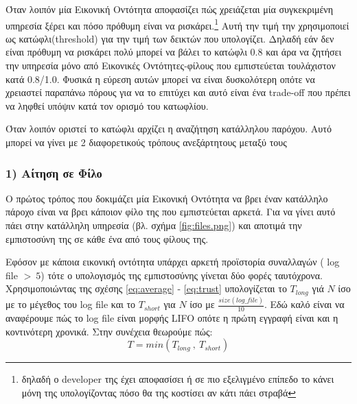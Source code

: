 Όταν λοιπόν μία Εικονική Οντότητα αποφασίζει πώς χρειάζεται μία συγκεκριμένη υπηρεσία ξέρει και πόσο πρόθυμη είναι να ρισκάρει.\footnote{δηλαδή ο developer της έχει αποφασίσει ή σε πιο εξελιγμένο επίπεδο το κάνει μόνη της υπολογίζοντας πόσο θα της κοστίσει αν κάτι πάει στραβά} Αυτή την τιμή την χρησιμοποιεί ως κατώφλι(threshold) για την τιμή των δεικτών που υπολογίζει. Δηλαδή εάν δεν είναι πρόθυμη να ρισκάρει πολύ μπορεί να βάλει το κατώφλι 0.8 και άρα να ζητήσει την υπηρεσία μόνο από Εικονικές Οντότητες-φίλους που εμπιστεύεται τουλάχιστον κατά 0.8/1.0. Φυσικά η εύρεση αυτών μπορεί να είναι δυσκολότερη οπότε να χρειαστεί παραπάνω πόρους για να το επιτύχει και αυτό είναι ένα trade-off που πρέπει να ληφθεί υπόψιν κατά τον ορισμό του κατωφλίου.

Όταν λοιπόν οριστεί το κατώφλι αρχίζει η αναζήτηση κατάλληλου παρόχου. Αυτό μπορεί να γίνει με 2 διαφορετικούς τρόπους ανεξάρτητους μεταξύ τους
\subsubsection{1) Αίτηση σε Φίλο}

Ο πρώτος τρόπος που δοκιμάζει μία Εικονική Οντότητα να βρει έναν κατάλληλο πάροχο είναι να βρει κάποιον φίλο της που εμπιστεύεται αρκετά. Για να γίνει αυτό πάει στην κατάλληλη υπηρεσία (βλ. σχήμα \ref{fig:files.png}) και αποτιμά την εμπιστοσύνη της σε κάθε ένα από τους φίλους της. 

Εφόσον με κάποια εικονική οντότητα υπάρχει αρκετή προϊστορία συναλλαγών ( log file $> \  5$) τότε ο υπολογισμός της εμπιστοσύνης γίνεται δύο φορές ταυτόχρονα. Χρησιμοποιώντας της σχέσης \ref{eq:average} - \ref{eq:trust} υπολογίζεται το $T_{long}$ γιά $ N $ ίσο με το μέγεθος του log file και το $T_{short}$ για $N$ ίσο με $\frac{size \left(log\_file\right)}{10}$. Εδώ καλό είναι να αναφέρουμε πώς το log file είναι μορφής LIFO οπότε η πρώτη εγγραφή είναι και η κοντινότερη χρονικά. Στην συνέχεια θεωρούμε πώς: $$ T = min(T_{long} \  , \  T_{short})$$

